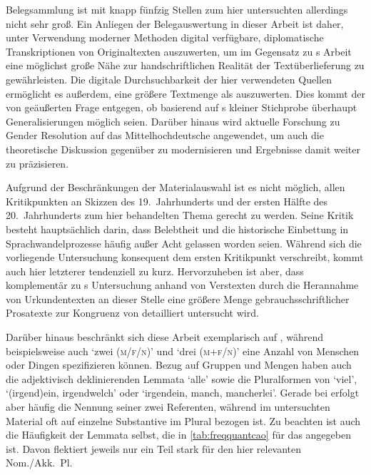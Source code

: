  Belegsammlung ist mit knapp fünfzig Stellen zum hier
untersuchten  allerdings nicht sehr groß. Ein Anliegen der
Belegauswertung in dieser Arbeit ist daher, unter Verwendung moderner Methoden
digital verfügbare, diplomatische Transkriptionen von Originaltexten
auszuwerten, um im Gegensatz zu \citeauthor{askedal1973}s Arbeit eine möglichst
große Nähe zur handschriftlichen Realität der Textüberlieferung zu
gewährleisten. Die digitale Durchsuchbarkeit der hier verwendeten Quellen
ermöglicht es außerdem, eine größere Textmenge als \citeauthor{askedal1973}
auszuwerten. Dies kommt der von \citet[118]{fleischerschallert2011} geäußerten
Frage entgegen, ob basierend auf \citeauthor{askedal1973}s kleiner Stichprobe
überhaupt Generalisierungen möglich seien. Darüber hinaus wird aktu\-elle
Forschung zu Gender Resolution auf das Mittelhochdeutsche angewendet, um auch
die theoretische Diskussion gegenüber \citet{askedal1973} zu modernisieren und
Ergebnisse damit weiter zu präzisieren.

Aufgrund der Beschränkungen der Materialauswahl ist es nicht möglich, allen
Kritikpunkten  an Skizzen des 19.\ Jahrhunderts und der
ersten Hälfte des 20.\ Jahrhunderts zum hier behandelten Thema gerecht zu
werden. Seine Kritik besteht hauptsächlich darin, dass Belebtheit und die
historische Einbettung in Sprachwandelprozesse häufig außer Acht gelassen
worden seien. Während sich die vorliegende Untersuchung konsequent dem ersten
Kritikpunkt verschreibt, kommt auch hier letzterer tendenziell zu kurz.
Hervorzuheben ist aber, dass komplementär zu \citeauthor{askedal1973}s
Unter\-suchung anhand von Vers\-texten durch die Herannahme von Urkundentexten
an dieser Stelle eine größere Menge gebrauchsschriftlicher Prosatexte zur
Kongruenz von  detailliert untersucht wird.

Darüber hinaus beschränkt sich diese Arbeit exemplarisch auf ,
während beispielsweise auch  `zwei (\textsc{m/f/n})' und
 `drei (\textsc{m+f/n})' eine Anzahl von Menschen oder Dingen
spezifizieren können. Bezug auf Gruppen und Mengen haben auch die adjektivisch
deklinierenden Lemmata  `alle' sowie die Pluralformen von
 `viel',  `(irgend)ein, irgendwelch' oder
 `irgendein, manch, mancherlei'. Gerade bei 
erfolgt aber häufig die Nennung seiner zwei Referenten, während im untersuchten
Material  oft auf einzelne Substantive im Plural bezogen ist. Zu
beachten ist auch die Häufigkeit der Lemmata selbst, die in
\cref{tab:freqquantcao} für das \CAO{} angegeben ist. Davon flektiert
jeweils nur ein Teil stark für den hier relevanten Nom./Akk.~Pl.

